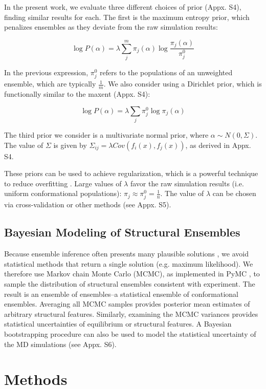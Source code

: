 \documentclass[11pt,titlepage]{article}
\begin{document}
In the present work, we evaluate three different choices of prior (Appx. S4), finding similar results for each.  The first is the maximum entropy prior, which penalizes ensembles as they deviate from the raw simulation results:

$$\log P(\alpha) = \lambda \sum_j^m \pi_j(\alpha) \log \frac{\pi_j(\alpha)}{\pi_j^0}$$

In the previous expression, $\pi_j^0$ refers to the populations of an unweighted ensemble, which are typically $\frac{1}{m}$.  We also consider using a Dirichlet prior, which is functionally similar to the maxent (Appx. S4):

$$\log P(\alpha) = \lambda \sum_j \pi_j^0 \log \pi_j(\alpha)$$

The third prior we consider is a multivariate normal prior, where  $\alpha \sim N(0, \Sigma)$.  The value of $\Sigma$ is given by $\Sigma_{ij} = \lambda Cov(f_i(x), f_j(x))$, as derived in Appx. S4.

These priors can be used to achieve regularization, which is a powerful technique to reduce overfitting \cite{friedman2001elements}.  Large values of $\lambda$ favor the raw simulation results (i.e. uniform conformational populations): $\pi_j \approx \pi_j^0 = \frac{1}{n}$.  The value of $\lambda$ can be chosen via cross-validation or other methods (see Appx. S5).  

\subsection*{Bayesian Modeling of Structural Ensembles}

Because ensemble inference often presents many plausible solutions \citep{fisher2010, rieping2005}, we avoid statistical methods that return a single solution (e.g. maximum likelihood).  We therefore use Markov chain Monte Carlo (MCMC), as implemented in PyMC \citep{patil2010pymc}, to sample the distribution of structural ensembles consistent with experiment.  The result is an ensemble of ensembles--a statistical ensemble of conformational ensembles.  Averaging all MCMC samples provides posterior mean  estimates of arbitrary structural features.  Similarly, examining the MCMC variances provides statistical uncertainties of equilibrium or structural features.  A Bayesian bootstrapping procedure \citep{rubin1981} can also be used to model the statistical uncertainty of the MD simulations (see Appx. S6).

\section*{Methods}
\end{document}

